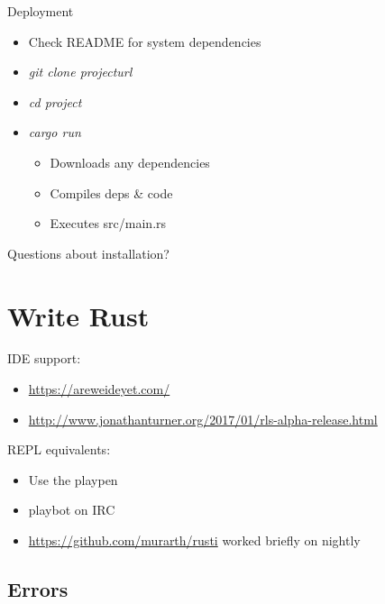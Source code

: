 \documentclass[aspectratio=169]{beamer}
\begin{document}
\begin{frame}
    Deployment
    \begin{itemize}
        \item Check README for system dependencies
        \item \textit{git clone projecturl}
        \item \textit{cd project}
        \item \textit{cargo run}
        \begin{itemize}
            \item Downloads any dependencies
            \item Compiles deps \& code
            \item Executes src/main.rs
        \end{itemize}
    \end{itemize}
\end{frame}



\begin{frame}
    \hfill Questions about installation?
\end{frame}


\section{Write Rust}

\begin{frame}
    IDE support:
    \begin{itemize}
        \item \url{https://areweideyet.com/}
        \item \url{http://www.jonathanturner.org/2017/01/rls-alpha-release.html}
    \end{itemize}
\end{frame}

\begin{frame}
    REPL equivalents:
    \begin{itemize}
        \item Use the playpen
        \item playbot on IRC
        \item \url{https://github.com/murarth/rusti} worked briefly on nightly
    \end{itemize}
\end{frame}


\subsection{Errors}
\end{document}
